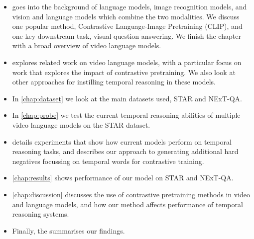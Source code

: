 \begin{itemize}
	\item {} goes into the background of language models,
		image recognition models, and vision and language models which combine
		the two modalities. We discuss one popular method, Contrastive
		Language-Image Pretraining (CLIP), and one key downstream task, visual
		question answering. We finish the chapter with a broad overview of video
		language models.
	\item {} explores related work on video language models,
		with a particular focus on work that explores the impact of contrastive
		pretraining. We also look at other approaches for instilling temporal
		reasoning in these models.
	\item In \cref{chap:dataset} we look at the main datasets used, STAR and NExT-QA.
	\item In \cref{chap:probe} we test the current temporal reasoning abilities
		of multiple video language models on the STAR dataset.
	\item {} details experiments that show how current
		models perform on temporal reasoning tasks, and describes our approach
		to generating additional hard negatives focussing on temporal words for
		contrastive training.
	\item \cref{chap:results} shows performance of our model on STAR and NExT-QA.
	\item \cref{chap:discussion} discusses the use of contrastive
		pretraining methods in video and language models, and how our method
		affects performance of temporal reasoning systems.
	\item Finally, the  summarises our findings.
\end{itemize}
